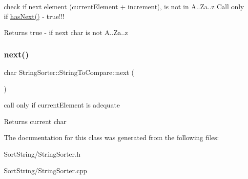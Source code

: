 check if next element (current\+Element + increment), is not in A..Za..z Call only if \hyperlink{classStringSorter_1_1StringToCompare_a60f405ee55a463629c87015d74691998}{has\+Next()} -\/ true!!! \begin{DoxyReturn}{Returns}
true -\/ if next char is not A..Za..z 
\end{DoxyReturn}
\mbox{\label{classStringSorter_1_1StringToCompare_af430553722c039a02c7373ca45162cca}} 
\subsubsection{\texorpdfstring{next()}{next()}}
{\footnotesize\ttfamily char String\+Sorter\+::\+String\+To\+Compare\+::next (\begin{DoxyParamCaption}{ }\end{DoxyParamCaption})}

call only if current\+Element is adequate \begin{DoxyReturn}{Returns}
current char 
\end{DoxyReturn}


The documentation for this class was generated from the following files\+:\begin{DoxyCompactItemize}
\item 
Sort\+String/String\+Sorter.\+h\item 
Sort\+String/String\+Sorter.\+cpp\end{DoxyCompactItemize}
